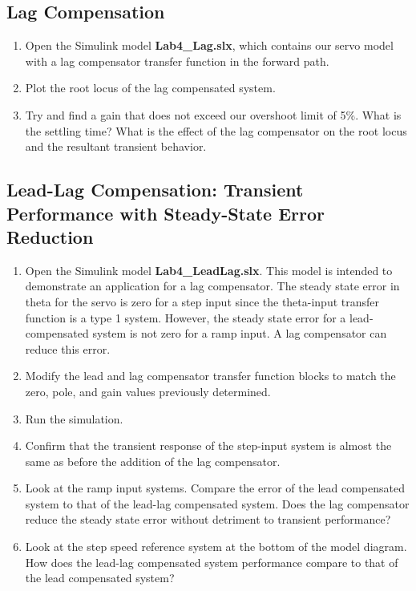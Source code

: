 \documentclass[11pt,a4paper]{article}
\begin{document}
\subsection{Lag Compensation}
\begin{enumerate}
\item Open the Simulink model \textbf{Lab4\_Lag.slx}, which contains our servo model with a lag compensator transfer function in the forward path.

\item Plot the root locus of the lag compensated system.

\item Try and find a gain that does not exceed our overshoot limit of 5\%. What is the settling time? What is the effect of the lag compensator on the root locus and the resultant transient behavior.

\end{enumerate}

\subsection{Lead-Lag Compensation: Transient Performance with Steady-State Error Reduction}

\begin{enumerate}
\item Open the Simulink model \textbf{Lab4\_LeadLag.slx}. This model is intended to demonstrate an application for a lag compensator. The steady state error in theta for the servo is zero for a step input since the theta-input transfer function is a type 1 system. However, the steady state error for a lead-compensated system is not zero for a ramp input. A lag compensator can reduce this error. 

\item Modify the lead and lag compensator transfer function blocks to match the zero, pole, and gain values previously determined.

\item Run the simulation.

\item Confirm that the transient response of the step-input system is almost the same as before the addition of the lag compensator.

\item Look at the ramp input systems. Compare the error of the lead compensated system to that of the lead-lag compensated system. Does the lag compensator reduce the steady state error without detriment to transient performance?

\item Look at the step speed reference system at the bottom of the model diagram. How does the lead-lag compensated system performance compare to that of the lead compensated system?

\end{enumerate}
\end{document}
